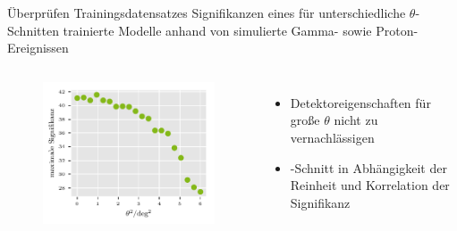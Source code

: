 \documentclass[aspectratio=1610, professionalfonts, 9pt]{beamer}
\begin{document}
\begin{frame}{Überprüfen Trainingsdatensatzes}
  Signifikanzen eines für unterschiedliche $\theta$-Schnitten trainierte Modelle anhand von simulierte Gamma- sowie Proton-Ereignissen
  \begin{columns}[onlytextwidth]
	\begin{figure}
	  \centering
	  \includegraphics[width=\textwidth]{./Plots/corr_sig_theta2.pdf}
	\end{figure}
	\begin{itemize}
	  \item Detektoreigenschaften für große $\theta$ nicht zu vernachlässigen
	  \item \theta-Schnitt in Abhängigkeit der Reinheit und Korrelation der Signifikanz
	\end{itemize}
  \end{columns}
\end{frame}
\end{document}
